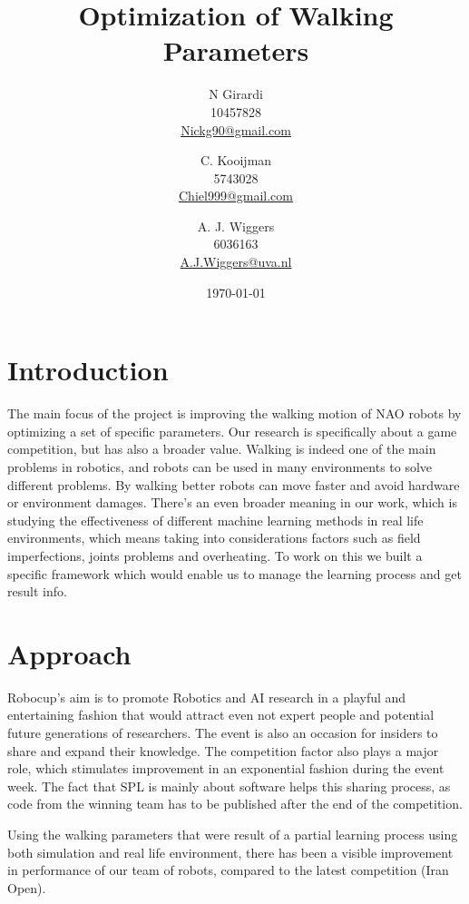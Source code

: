 \documentclass[a4paper, twocolumn]{article}
\title{Optimization of Walking Parameters}
\author{
N Girardi\\10457828\\\url{Nickg90@gmail.com} \and
C. Kooijman\\5743028\\\url{Chiel999@gmail.com} \and
A. J. Wiggers\\6036163\\\url{A.J.Wiggers@uva.nl}
}
\date{\today}
\begin{document}
\maketitle


\section{Introduction}
The main focus of the project is improving the walking motion of NAO robots by optimizing a set of specific parameters. Our research is specifically about a game competition, but has also a broader value. Walking is indeed one of the main problems in robotics, and robots can be used in many environments to solve different problems. By walking better robots can move faster and avoid hardware or environment damages. There's an even broader meaning in our work, which is studying the effectiveness of different machine learning methods in real life environments, which means taking into considerations factors such as field imperfections, joints problems and overheating. To work on this we built a specific framework which would enable us to manage the learning process and get result info. 

\section{Approach}
Robocup's aim is to promote Robotics and AI research in a playful and entertaining fashion that would attract even not expert people and potential future generations of researchers. The event is also an occasion for insiders to share and expand their knowledge. The competition factor also plays a major role, which stimulates improvement in an exponential fashion during the event week. The fact that SPL is mainly about software helps this sharing process, as code from the winning team has to be published after the end of the competition. 

Using the walking parameters that were result of a partial learning process using both simulation and real life environment, there has been a visible improvement in performance of our team of robots, compared to the latest competition (Iran Open). 
 
\end{document}

